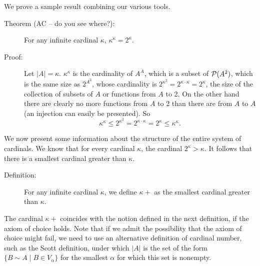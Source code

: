 \documentclass[12pt]{book}
\begin{document}
We prove a sample result combining our various tools.

\begin{description}

\item[Theorem (AC -- do you see where?):]  For any infinite cardinal $\kappa$, $\kappa^{\kappa}=2^{\kappa}$.

\item[Proof:]  Let $|A|=\kappa$.  $\kappa^{\kappa}$ is the cardinality of $A^A$, which is a subset of ${\cal P}(A^2)$, which is the same size as
$2^{A^2}$, whose cardinality is $2^{\kappa^2} = 2^{\kappa \cdot \kappa} = 2^{\kappa}$, the size of the collection of subsets of $A$ or functions from $A$ to 2.  On the other hand there are clearly no more functions from $A$ to 2 than there are from $A$ to $A$ (an injection can easily be presented).  So $$\kappa^{\kappa} \leq 2^{\kappa^2} = 2^{\kappa \cdot \kappa} = 2^{\kappa} \leq \kappa^{\kappa}.$$

\end{description}

We now present some information about the structure of the entire system of cardinals.   We know that for every cardinal $\kappa$, the cardinal $2^{\kappa}>\kappa$.  It follows that there is a smallest cardinal greater than $\kappa$.

\begin{description}

\item[Definition:]  For any infinite cardinal $\kappa$, we define $\kappa+$ as the smallest cardinal greater than $\kappa$.

\end{description}

The cardinal $\kappa+$ coincides with the notion defined in the next definition, if the axiom of choice holds.  Note that if we admit the possibility that the axiom of choice might fail, we need to use an alternative definition of cardinal number, such as the Scott definition, under which $|A|$ is the set of the form $\{B \sim A \mid B \in V_{\alpha}\}$ for the smallest $\alpha$ for which this set is nonempty.
\end{document}
